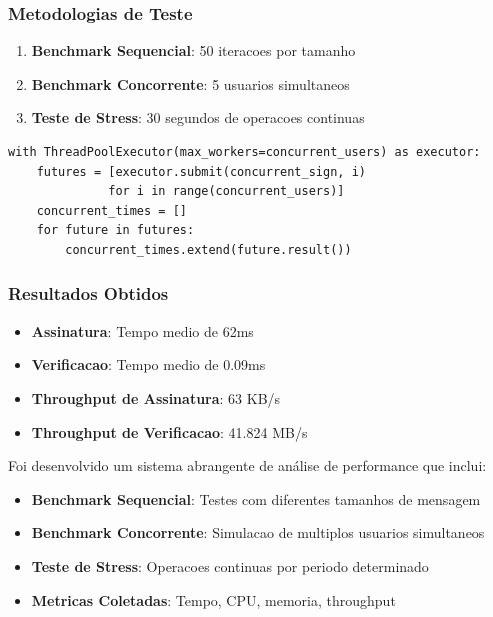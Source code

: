 \documentclass[12pt,a4paper,oneside]{article}
\begin{document}
\subsubsection{Metodologias de Teste}

\begin{enumerate}
    \item \textbf{Benchmark Sequencial}: 50 iteracoes por tamanho
    \item \textbf{Benchmark Concorrente}: 5 usuarios simultaneos
    \item \textbf{Teste de Stress}: 30 segundos de operacoes continuas
\end{enumerate}

\begin{lstlisting}[caption=Implementacao do teste concorrente]
with ThreadPoolExecutor(max_workers=concurrent_users) as executor:
    futures = [executor.submit(concurrent_sign, i) 
              for i in range(concurrent_users)]
    concurrent_times = []
    for future in futures:
        concurrent_times.extend(future.result())
\end{lstlisting}

\subsubsection{Resultados Obtidos}

\begin{itemize}
    \item \textbf{Assinatura}: Tempo medio de 62ms
    \item \textbf{Verificacao}: Tempo medio de 0.09ms
    \item \textbf{Throughput de Assinatura}: 63 KB/s
    \item \textbf{Throughput de Verificacao}: 41.824 MB/s
\end{itemize}

Foi desenvolvido um sistema abrangente de análise de performance que inclui:

\begin{itemize}
    \item \textbf{Benchmark Sequencial}: Testes com diferentes tamanhos de mensagem
    \item \textbf{Benchmark Concorrente}: Simulacao de multiplos usuarios simultaneos
    \item \textbf{Teste de Stress}: Operacoes continuas por periodo determinado
    \item \textbf{Metricas Coletadas}: Tempo, CPU, memoria, throughput
\end{itemize}
\end{document}
